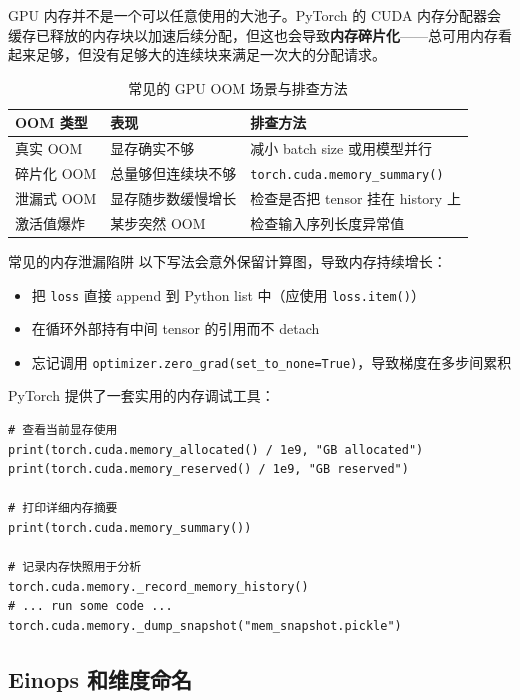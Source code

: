 GPU 内存并不是一个可以任意使用的大池子。PyTorch 的 CUDA 内存分配器会缓存已释放的内存块以加速后续分配，但这也会导致\textbf{内存碎片化}——总可用内存看起来足够，但没有足够大的连续块来满足一次大的分配请求。

\begin{table}[H]
\centering
\begin{tabular}{p{}p{}p{}}
\toprule
\textbf{OOM 类型} & \textbf{表现} & \textbf{排查方法} \\
\midrule
真实 OOM & 显存确实不够 & 减小 batch size 或用模型并行 \\
碎片化 OOM & 总量够但连续块不够 & \texttt{torch.cuda.memory\_summary()} \\
泄漏式 OOM & 显存随步数缓慢增长 & 检查是否把 tensor 挂在 history 上 \\
激活值爆炸 & 某步突然 OOM & 检查输入序列长度异常值 \\
\bottomrule
\end{tabular}
\caption{常见的 GPU OOM 场景与排查方法}
\end{table}

\begin{warningbox}{常见的内存泄漏陷阱}
以下写法会意外保留计算图，导致内存持续增长：
\begin{itemize}
    \item 把 \texttt{loss} 直接 append 到 Python list 中（应使用 \texttt{loss.item()}）
    \item 在循环外部持有中间 tensor 的引用而不 detach
    \item 忘记调用 \texttt{optimizer.zero\_grad(set\_to\_none=True)}，导致梯度在多步间累积
\end{itemize}
\end{warningbox}

PyTorch 提供了一套实用的内存调试工具：

\begin{lstlisting}[caption={GPU 内存调试常用命令}]
# 查看当前显存使用
print(torch.cuda.memory_allocated() / 1e9, "GB allocated")
print(torch.cuda.memory_reserved() / 1e9, "GB reserved")

# 打印详细内存摘要
print(torch.cuda.memory_summary())

# 记录内存快照用于分析
torch.cuda.memory._record_memory_history()
# ... run some code ...
torch.cuda.memory._dump_snapshot("mem_snapshot.pickle")
\end{lstlisting}

\subsection{Einops 和维度命名}

